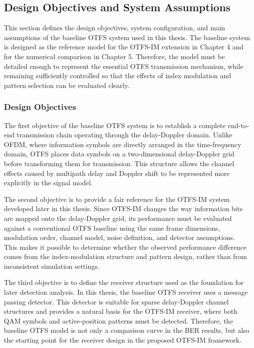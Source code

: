\subsection{Design Objectives and System Assumptions}

This section defines the design objectives, system configuration, and main assumptions of the baseline OTFS system used in this thesis. The baseline system is designed as the reference model for the OTFS-IM extension in Chapter 4 and for the numerical comparison in Chapter 5. Therefore, the model must be detailed enough to represent the essential OTFS transmission mechanism, while remaining sufficiently controlled so that the effects of index modulation and pattern selection can be evaluated clearly.

\subsubsection{Design Objectives}

The first objective of the baseline OTFS system is to establish a complete end-to-end transmission chain operating through the delay-Doppler domain. Unlike OFDM, where information symbols are directly arranged in the time-frequency domain, OTFS places data symbols on a two-dimensional delay-Doppler grid before transforming them for transmission. This structure allows the channel effects caused by multipath delay and Doppler shift to be represented more explicitly in the signal model.

The second objective is to provide a fair reference for the OTFS-IM system developed later in this thesis. Since OTFS-IM changes the way information bits are mapped onto the delay-Doppler grid, its performance must be evaluated against a conventional OTFS baseline using the same frame dimensions, modulation order, channel model, noise definition, and detector assumptions. This makes it possible to determine whether the observed performance difference comes from the index-modulation structure and pattern design, rather than from inconsistent simulation settings.

The third objective is to define the receiver structure used as the foundation for later detection analysis. In this thesis, the baseline OTFS receiver uses a message passing detector. This detector is suitable for sparse delay-Doppler channel structures and provides a natural basis for the OTFS-IM receiver, where both QAM symbols and active-position patterns must be detected. Therefore, the baseline OTFS model is not only a comparison curve in the BER results, but also the starting point for the receiver design in the proposed OTFS-IM framework.

